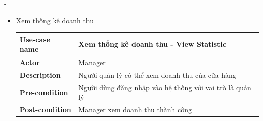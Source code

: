\begin {list} {-}{}
\begin{itemize}
\begin{table}[h]
\begin{tabular}{|l|l|}
            \end{tabular}
            \begin{center}
                Bảng 3.7: Đặc tả use case quản lý người dùng
            \end{center}
            \end{table}
            \item Xem thống kê doanh thu
            \begin{table}[h]
                \begin{tabular}{|l|l|}
                \hline
                \textbf{Use-case name}    & \textbf{Xem thống kê doanh thu - View Statistic}                                                                                                                                                                                                                                                                                                                                 \\ \hline
                \textbf{Actor}            & Manager                                                                                                                                                                                                                                                                                                                                                                          \\ \hline
                \textbf{Description}      & Người quản lý có thể xem doanh thu của cửa hàng                                                                                                                                                                                                                                                                                                                                  \\ \hline
                \textbf{Pre-condition}    & Người dùng đăng nhập vào hệ thống với vai trò là quản lý                                                                                                                                                                                                                                                                                                                         \\ \hline
                \textbf{Post-condition}   & Manager xem doanh thu thành công                                                                                                                                                                                                                                                                                                                                                 \\ \hline

\end{tabular}
\end{table}
\end{itemize}
\end{list}
